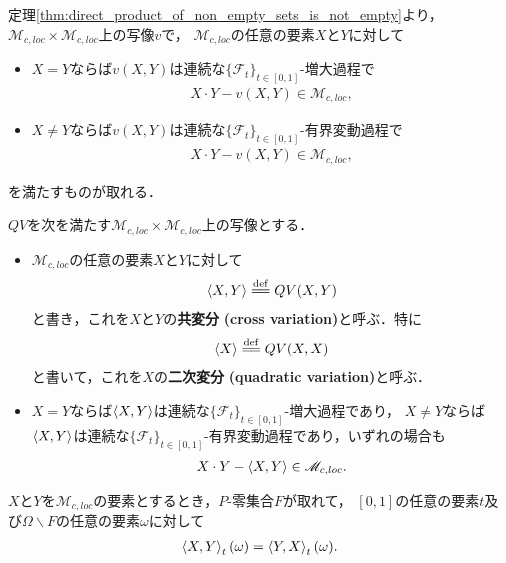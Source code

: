 	定理\ref{thm:direct_product_of_non_empty_sets_is_not_empty}より，
	$\mathscr{M}_{c,loc} \times \mathscr{M}_{c,loc}$上の写像$v$で，
	$\mathscr{M}_{c,loc}$の任意の要素$X$と$Y$に対して
	\begin{itemize}
		\item $X = Y$ならば$v(X,Y)$は連続な$\{\mathscr{F}_{t}\}_{t \in [0,1]}$-増大過程で
			\begin{align}
				X \cdot Y - v(X,Y) \in \mathscr{M}_{c,loc},
			\end{align}
			
		\item $X \neq Y$ならば$v(X,Y)$は連続な$\{\mathscr{F}_{t}\}_{t \in [0,1]}$-有界変動過程で
			\begin{align}
				X \cdot Y - v(X,Y) \in \mathscr{M}_{c,loc},
			\end{align}
	\end{itemize}
	を満たすものが取れる．
	
	\begin{screen}
		\begin{dfn}[二次変分]
			$QV$を次を満たす$\mathscr{M}_{c,loc} \times \mathscr{M}_{c,loc}$上の写像とする．
			\begin{itemize}
				\item $\mathscr{M}_{c,loc}$の任意の要素$X$と$Y$に対して
					\begin{align}
						\inprod<X,Y> \defeq QV(X,Y)
					\end{align}
					と書き，これを$X$と$Y$の{\bf 共変分}
					{\bf (cross variation)}と呼ぶ．特に
					\begin{align}
						\inprod<X> \defeq QV(X,X)
					\end{align}
					と書いて，これを$X$の{\bf 二次変分}
					{\bf (quadratic variation)}と呼ぶ．
					
				\item $X = Y$ならば$\inprod<X,Y>$は連続な$\{\mathscr{F}_{t}\}_{t \in [0,1]}$-増大過程であり，
				$X \neq Y$ならば$\inprod<X,Y>$は連続な$\{\mathscr{F}_{t}\}_{t \in [0,1]}$-有界変動過程であり，いずれの場合も
					\begin{align}
						X \cdot Y - \inprod<X,Y> \in \mathscr{M}_{c,loc}.
					\end{align}
			\end{itemize}
		\end{dfn}
	\end{screen}
	
	\begin{screen}
		\begin{thm}[共変分の対称性]
			$X$と$Y$を$\mathscr{M}_{c,loc}$の要素とするとき，$P$-零集合$F$が取れて，
			$[0,1]$の任意の要素$t$及び$\Omega \backslash F$の任意の要素$\omega$に対して
			\begin{align}
				\inprod<X,Y>_{t}(\omega) = \inprod<Y,X>_{t}(\omega).
			\end{align}
		\end{thm}
	\end{screen}
	
